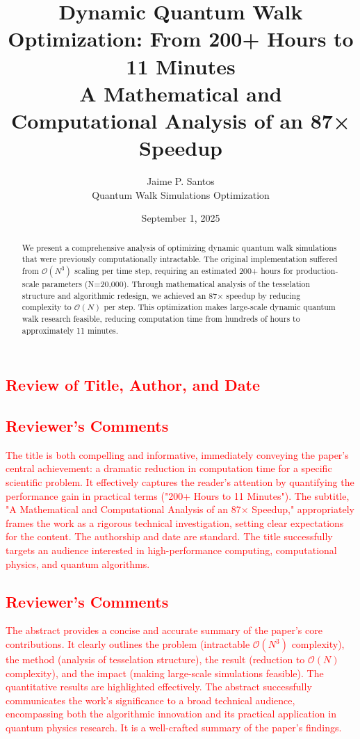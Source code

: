 \documentclass[11pt,a4paper]{article}
\title{\textbf{Dynamic Quantum Walk Optimization: From 200+ Hours to 11 Minutes}\\
\large A Mathematical and Computational Analysis of an 87× Speedup}
\author{Jaime P. Santos\\
\small Quantum Walk Simulations Optimization}
\date{September 1, 2025}
\newcommand{\bigO}{\mathcal{O}}
\begin{document}
\maketitle

\textcolor{red}{
\section*{Review of Title, Author, and Date}
\subsection*{Reviewer's Comments}
The title is both compelling and informative, immediately conveying the paper's central achievement: a dramatic reduction in computation time for a specific scientific problem. It effectively captures the reader's attention by quantifying the performance gain in practical terms ("200+ Hours to 11 Minutes"). The subtitle, "A Mathematical and Computational Analysis of an 87× Speedup," appropriately frames the work as a rigorous technical investigation, setting clear expectations for the content. The authorship and date are standard. The title successfully targets an audience interested in high-performance computing, computational physics, and quantum algorithms.
}

\begin{abstract}
We present a comprehensive analysis of optimizing dynamic quantum walk simulations that were previously computationally intractable. The original implementation suffered from $\bigO(N^3)$ scaling per time step, requiring an estimated 200+ hours for production-scale parameters (N=20,000). Through mathematical analysis of the tesselation structure and algorithmic redesign, we achieved an 87× speedup by reducing complexity to $\bigO(N)$ per step. This optimization makes large-scale dynamic quantum walk research feasible, reducing computation time from hundreds of hours to approximately 11 minutes.
\end{abstract}

\textcolor{red}{
\subsection*{Reviewer's Comments}
The abstract provides a concise and accurate summary of the paper's core contributions. It clearly outlines the problem (intractable $\bigO(N^3)$ complexity), the method (analysis of tesselation structure), the result (reduction to $\bigO(N)$ complexity), and the impact (making large-scale simulations feasible). The quantitative results are highlighted effectively. The abstract successfully communicates the work's significance to a broad technical audience, encompassing both the algorithmic innovation and its practical application in quantum physics research. It is a well-crafted summary of the paper's findings.
}
\end{document}
